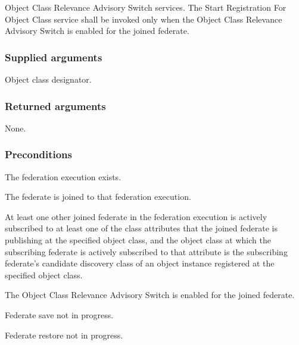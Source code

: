 \clearpage

\begin{compactstdpage}
    Object Class Relevance Advisory Switch services. The Start Registration For Object Class \rtiinitiated{} service shall be invoked only when the Object Class Relevance Advisory Switch is enabled for the joined federate.

    \subsubsection{Supplied arguments}
    \begin{stdalphalist}
        \item Object class designator.
    \end{stdalphalist}

    \subsubsection{Returned arguments}
    \begin{stdalphalist}
        \item None.
    \end{stdalphalist}

    \subsubsection{Preconditions}
    \begin{stdalphalist}
        \item The federation execution exists.
        \item The federate is joined to that federation execution.
        \item At least one other joined federate in the federation execution is actively subscribed to at least one of the class attributes that the joined federate is publishing at the specified object class, and the object class at which the subscribing federate is actively subscribed to that attribute is the subscribing federate's candidate discovery class of an object instance registered at the specified object class.
        \item The Object Class Relevance Advisory Switch is enabled for the joined federate.
        \item Federate save not in progress.
        \item Federate restore not in progress.
    \end{stdalphalist}


\end{compactstdpage}
